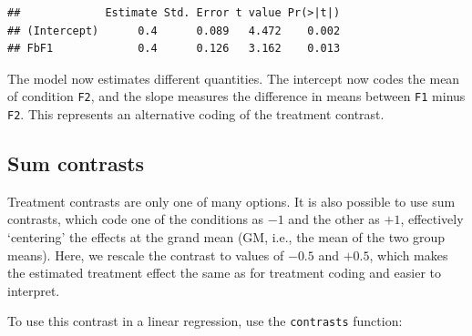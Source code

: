 \documentclass[12pt,]{krantz}
\newenvironment{Shaded}{\begin{snugshade}}{\end{snugshade}}
\newcommand{\DataTypeTok}[1]{\textcolor[rgb]{0.13,0.29,0.53}{#1}}
\newcommand{\DecValTok}[1]{\textcolor[rgb]{0.00,0.00,0.81}{#1}}
\newcommand{\FloatTok}[1]{\textcolor[rgb]{0.00,0.00,0.81}{#1}}
\newcommand{\KeywordTok}[1]{\textcolor[rgb]{0.13,0.29,0.53}{\textbf{#1}}}
\newcommand{\NormalTok}[1]{#1}
\newcommand{\OperatorTok}[1]{\textcolor[rgb]{0.81,0.36,0.00}{\textbf{#1}}}
\newcommand{\StringTok}[1]{\textcolor[rgb]{0.31,0.60,0.02}{#1}}
\begin{document}
\begin{Shaded}
\end{Shaded}

\begin{verbatim}
##             Estimate Std. Error t value Pr(>|t|)
## (Intercept)      0.4      0.089   4.472    0.002
## FbF1             0.4      0.126   3.162    0.013
\end{verbatim}

The model now estimates different quantities. The intercept now codes the mean of condition \texttt{F2}, and the slope measures the difference in means between \texttt{F1} minus \texttt{F2}. This represents an alternative coding of the treatment contrast.

\hypertarget{effectcoding}{%
\subsection{Sum contrasts}\label{effectcoding}}

Treatment contrasts are only one of many options. It is also possible to use sum contrasts, which code one of the conditions as \(-1\) and the other as \(+1\), effectively `centering' the effects at the grand mean (GM, i.e., the mean of the two group means). Here, we rescale the contrast to values of \(-0.5\) and \(+0.5\), which makes the estimated treatment effect the same as for treatment coding and easier to interpret.

To use this contrast in a linear regression, use the \texttt{contrasts} function:

\begin{Shaded}
\end{Shaded}

\begin{Shaded}
\end{Shaded}
\end{document}
